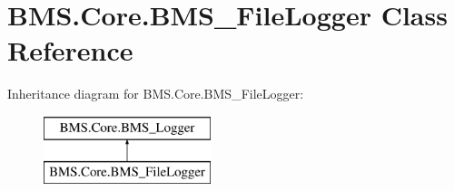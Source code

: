 \hypertarget{class_b_m_s_1_1_core_1_1_b_m_s___file_logger}{\section{B\-M\-S.\-Core.\-B\-M\-S\-\_\-\-File\-Logger Class Reference}
\label{class_b_m_s_1_1_core_1_1_b_m_s___file_logger}
}
Inheritance diagram for B\-M\-S.\-Core.\-B\-M\-S\-\_\-\-File\-Logger\-:\begin{figure}[H]
\begin{center}
\leavevmode
\includegraphics[height=2.000000cm]{class_b_m_s_1_1_core_1_1_b_m_s___file_logger}
\end{center}
\end{figure}
